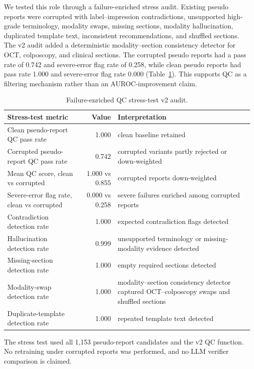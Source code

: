 \documentclass[11pt, a4paper]{article}
\theoremstyle{plain}
\theoremstyle{definition}
\begin{document}
We tested this role through a failure-enriched stress audit. Existing pseudo reports were corrupted with label--impression contradictions, unsupported high-grade terminology, modality swaps, missing sections, modality hallucination, duplicated template text, inconsistent recommendations, and shuffled sections. The v2 audit added a deterministic modality--section consistency detector for OCT, colposcopy, and clinical sections. The corrupted pseudo reports had a pass rate of 0.742 and severe-error flag rate of 0.258, while clean pseudo reports had pass rate 1.000 and severe-error flag rate 0.000 (Table~\ref{tab:qc_failure_stress_test}). This supports QC as a filtering mechanism rather than an AUROC-improvement claim.

\begin{table}[!htbp]
  \centering
  \caption{Failure-enriched QC stress-test v2 audit.}
  \label{tab:qc_failure_stress_test}
  \small
  \begin{threeparttable}
  \begin{tabular}{p{5.0cm}rp{5.2cm}}
    \toprule
    \textbf{Stress-test metric} & \textbf{Value} & \textbf{Interpretation} \\
    \midrule
    Clean pseudo-report QC pass rate & 1.000 & clean baseline retained \\
    Corrupted pseudo-report QC pass rate & 0.742 & corrupted variants partly rejected or down-weighted \\
    Mean QC score, clean vs corrupted & 1.000 vs 0.855 & corrupted reports down-weighted \\
    Severe-error flag rate, clean vs corrupted & 0.000 vs 0.258 & severe failures enriched among corrupted reports \\
    Contradiction detection rate & 1.000 & expected contradiction flags detected \\
    Hallucination detection rate & 0.999 & unsupported terminology or missing-modality evidence detected \\
    Missing-section detection rate & 1.000 & empty required sections detected \\
    Modality-swap detection rate & 1.000 & modality--section consistency detector captured OCT--colposcopy swaps and shuffled sections \\
    Duplicate-template detection rate & 1.000 & repeated template text detected \\
    \bottomrule
  \end{tabular}
  \begin{tablenotes}[flushleft]
    \footnotesize
    \item The stress test used all 1,153 pseudo-report candidates and the v2 QC function. No retraining under corrupted reports was performed, and no LLM verifier comparison is claimed.
  \end{tablenotes}
  \end{threeparttable}
\end{table}
\end{document}
